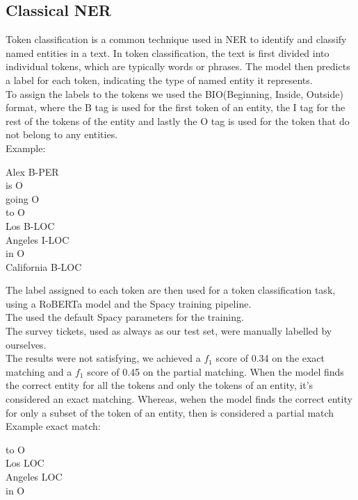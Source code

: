 \subsection{Classical NER}
Token classification is a common technique used in NER to identify and classify named entities in a text. In token classification, the text is first divided into individual tokens, which are typically words or phrases. The model then predicts a label for each token, indicating the type of named entity it represents.\\
To assign the labels to the tokens we used the BIO(Beginning, Inside, Outside) format, where the B tag is used for the first token of an entity, the I tag for the rest of the tokens of the entity and lastly the O tag is used for the token that do not belong to any entities. \\
Example:
\begin{adjustwidth}{1cm}{}
    Alex B-PER\\
    is O\\
    going O\\
    to O\\
    Los B-LOC\\
    Angeles I-LOC\\
    in O\\
    California B-LOC
\end{adjustwidth}
The label assigned to each token are then used for a token classification task, using a RoBERTa model and the Spacy training pipeline. \\
The used the default Spacy parameters for the training. \\
The survey tickets, used as always as our test set, were manually labelled by ourselves. \\
The results were not satisfying, we achieved a $f_1$ score of 0.34 on the exact matching and a $f_1$ score of 0.45 on the partial matching. When the model finds the correct entity for all the tokens and only the tokens of an entity, it's considered an exact matching. Whereas, wehen the model finds the correct entity for only a subset of the token of an entity, then is considered a partial match\\
Example exact match:
\begin{adjustwidth}{1cm}{}
    to O\\
    Los LOC\\
    Angeles LOC\\
    in O\\
\end{adjustwidth}
